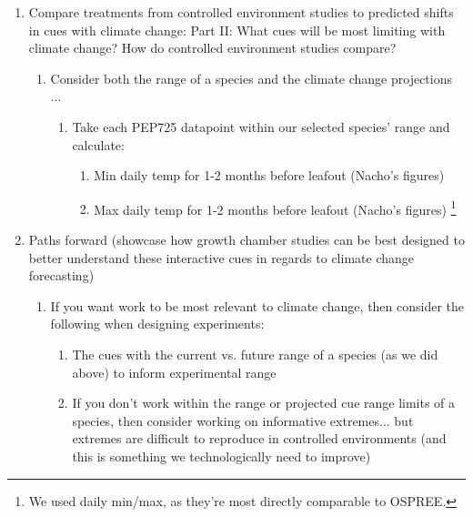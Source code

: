 \documentclass[11pt,letterpaper]{article}
\begin{document}
\begin{enumerate}
\begin{enumerate}
\begin{enumerate}
\end{enumerate}
\item X\% of studies manipulated which interacting cues? (i.e., how many studies manipulate 1 cues, 2 cues, 3 cues ... of those manipulating 1 cue, what is the breakdown by cue etc.)
\end{enumerate}
\item Compare treatments from controlled environment studies to predicted shifts in cues with climate change: Part II: What cues will be most limiting with climate change? How do controlled environment studies compare? 
\begin{enumerate}
\item Consider both the range of a species and the climate change projections ...
\begin{enumerate}
\item Take each PEP725 datapoint within our selected species' range and calculate:
\begin{enumerate}
\item Min daily temp for 1-2 months before leafout (Nacho's figures)
\item Max daily temp for 1-2 months before leafout (Nacho's figures) \footnote{We used daily min/max, as they're most directly comparable to OSPREE.}
\end{enumerate}
\end{enumerate}
\end{enumerate}
\item Paths forward (showcase how growth chamber studies can be best designed to better understand these interactive cues in regards to climate change forecasting) 
\begin{enumerate}
\item If you want work to be most relevant to climate change, then consider the following when designing experiments:
\begin{enumerate}
\item The cues with the current vs. future range of a species (as we did above) to inform experimental range %
\item If you don't work within the range or projected cue range limits of a species, then consider working on informative extremes... but extremes are difficult to reproduce in controlled environments (and this is something we technologically need to improve)

\end{enumerate}
\end{enumerate}
\end{enumerate}
\end{document}
